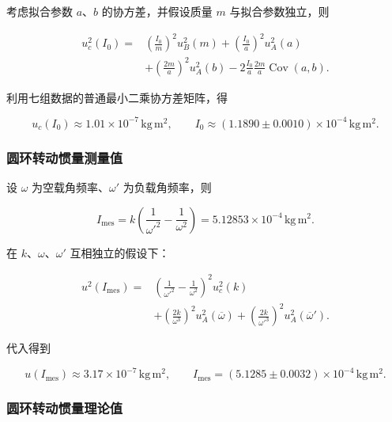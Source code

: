 \documentclass[UTF8]{ctexart}
\begin{document}
考虑拟合参数 $a$、$b$ 的协方差，并假设质量 $m$ 与拟合参数独立，则

\begin{equation}
 \begin{aligned}
 u_c^2(I_0)={}&\left(\frac{I_0}{m}\right)^2u_B^2(m)
 +\left(\frac{I_0}{a}\right)^2u_A^2(a)\\
 &+\left(\frac{2m}{a}\right)^2u_A^2(b)
 -2\frac{I_0}{a}\frac{2m}{a}\operatorname{Cov}(a,b).
 \end{aligned}
\end{equation}

利用七组数据的普通最小二乘协方差矩阵，得

\begin{equation}
 u_c(I_0)\approx1.01\times10^{-7}\,\mathrm{kg\,m^2},\qquad
 I_0\approx(1.1890\pm0.0010)\times10^{-4}\,\mathrm{kg\,m^2}.
\end{equation}

\subsubsection{圆环转动惯量测量值}

设 $\omega$ 为空载角频率、$\omega'$ 为负载角频率，则

\begin{equation}
 I_{\mathrm{mes}}=k\left(\frac1{\omega'^2}-\frac1{\omega^2}\right)
 =5.12853\times10^{-4}\,\mathrm{kg\,m^2}.
\end{equation}

在 $k$、$\omega$、$\omega'$ 互相独立的假设下：

\begin{equation}
 \begin{aligned}
 u^2(I_{\mathrm{mes}})={}&
 \left(\frac1{\omega'^2}-\frac1{\omega^2}\right)^2u_c^2(k)\\
 &+\left(\frac{2k}{\omega^3}\right)^2u_A^2(\overline\omega)
 +\left(\frac{2k}{\omega'^3}\right)^2u_A^2(\overline\omega').
 \end{aligned}
\end{equation}

代入得到

\begin{equation}
 u(I_{\mathrm{mes}})\approx3.17\times10^{-7}\,\mathrm{kg\,m^2},\qquad
 \boxed{I_{\mathrm{mes}}=(5.1285\pm0.0032)\times10^{-4}\,\mathrm{kg\,m^2}}.
\end{equation}

\subsubsection{圆环转动惯量理论值}
\end{document}
